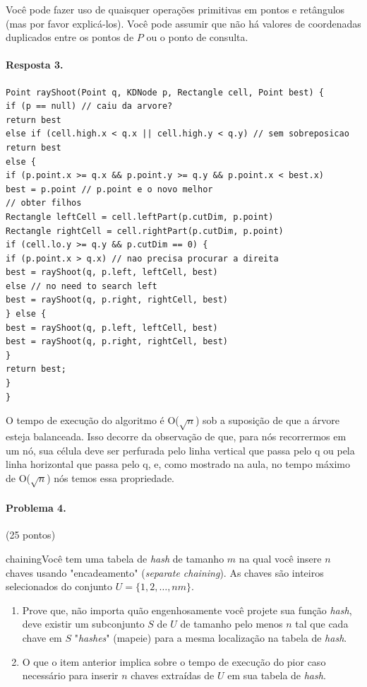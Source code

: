\documentclass{article}
\begin{document}
Você pode fazer uso de quaisquer operações primitivas em pontos e retângulos (mas por favor
explicá-los). Você pode assumir que não há valores de coordenadas duplicados entre os pontos de $P$ ou o ponto de consulta.

\paragraph{Resposta 3.}

\begin{lstlisting}
Point rayShoot(Point q, KDNode p, Rectangle cell, Point best) {
if (p == null) // caiu da arvore?
return best
else if (cell.high.x < q.x || cell.high.y < q.y) // sem sobreposicao
return best
else {
if (p.point.x >= q.x && p.point.y >= q.y && p.point.x < best.x)
best = p.point // p.point e o novo melhor
// obter filhos
Rectangle leftCell = cell.leftPart(p.cutDim, p.point)
Rectangle rightCell = cell.rightPart(p.cutDim, p.point)
if (cell.lo.y >= q.y && p.cutDim == 0) {
if (p.point.x > q.x) // nao precisa procurar a direita
best = rayShoot(q, p.left, leftCell, best)
else // no need to search left
best = rayShoot(q, p.right, rightCell, best)
} else {
best = rayShoot(q, p.left, leftCell, best)
best = rayShoot(q, p.right, rightCell, best)
}
return best;
}
}
\end{lstlisting}

O tempo de execução do algoritmo é O($\sqrt{n}$) sob a suposição de que a árvore esteja balanceada. Isso decorre da observação de que, para nós recorrermos em um nó, sua célula deve ser perfurada pelo linha vertical que passa pelo q ou pela linha horizontal que passa pelo q, e, como mostrado na aula, no tempo máximo de O($\sqrt{n}$) nós temos essa propriedade.

\paragraph{Problema 4.} (25 pontos)

chainingVocê tem uma tabela de \textit{hash} de tamanho $m$ na qual você insere $n$ chaves usando
"encadeamento" (\textit{separate chaining}). As chaves são inteiros selecionados do conjunto $U = \{1, 2, \dots , nm\}$.

\begin{enumerate}[label=\alph*)]
    \item Prove que, não importa quão engenhosamente você projete sua função \textit{hash},
deve existir um subconjunto $S$ de $U$ de tamanho pelo menos $n$ tal que cada chave em $S$ "\textit{hashes}" (mapeie) para a mesma localização na tabela de \textit{hash}.
    \item O que o item anterior implica sobre o tempo de execução do pior caso necessário para inserir $n$ chaves extraídas de $U$ em sua tabela de \textit{hash}.
\end{enumerate}
\end{document}
